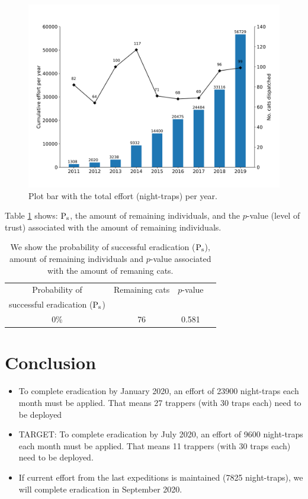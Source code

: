 \documentclass{article}
\begin{document}
\begin{figure}[H]
    \centering
\includegraphics[scale=0.5]{figures/TotalCapturasPorAnioGatosSocorro.png}
\caption{Plot bar with the total effort (night-traps) per year.}
\label{fig:histogramaEsfuerzoTotalPorAnio}
\end{figure}


Table \ref{table:individuosRemanentes} shows: $\textnormal{P}_\textnormal{s}$, 
the amount of remaining individuals, and the $p$-value (level of trust) associated with the amount of remaining individuals.


\begin{table}[H]
\centering
\caption{\small{We show the probability of successful eradication ($\textnormal{P}_\textnormal{s}$), amount of remaining individuals and $p$-value associated with the amount of remaning cats.}}
\label{table:individuosRemanentes}
\begin{tabular}{ |c|c|c|c| }
    \hline
    Probability of & Remaining cats & $p$-value \\
    successful eradication ($\textnormal{P}_\textnormal{s}$) & & \\
    \hline
    0\%      & 76  & 0.581 \\
    \hline
\end{tabular}
\end{table}

\section*{Conclusion}

\begin{itemize}
\item To complete eradication by January 2020, an effort of 23900 night-traps each month must be applied. That means 27 trappers (with 30 traps each) need to be deployed
\item  TARGET: To complete eradication by July 2020, an effort of 9600 night-traps each month must be applied. That means 11 trappers (with 30 traps each) need to be deployed.
\item If current effort from the last expeditions is maintained (7825 night-traps), we will complete eradication in September 2020.
\end{itemize}
\end{document}
